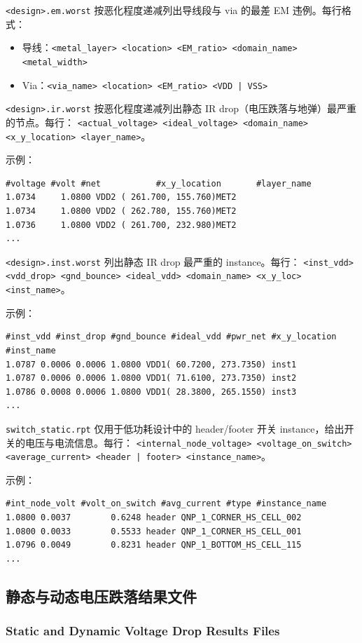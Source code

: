 \texttt{<design>.em.worst} 按恶化程度递减列出导线段与 via 的最差 EM 违例。每行格式：
\begin{itemize}
  \item 导线：\texttt{<metal\_layer> <location> <EM\_ratio> <domain\_name> <metal\_width>}
  \item Via：\texttt{<via\_name> <location> <EM\_ratio> <VDD | VSS>}
\end{itemize}

\texttt{<design>.ir.worst} 按恶化程度递减列出静态 IR drop（电压跌落与地弹）最严重的节点。每行：
\texttt{<actual\_voltage> <ideal\_voltage> <domain\_name> <x\_y\_location> <layer\_name>}。

示例：
\begin{lstlisting}
#voltage #volt #net           #x_y_location       #layer_name
1.0734     1.0800 VDD2 ( 261.700, 155.760)MET2
1.0734     1.0800 VDD2 ( 262.780, 155.760)MET2
1.0736     1.0800 VDD2 ( 261.700, 232.980)MET2
...
\end{lstlisting}

\texttt{<design>.inst.worst} 列出静态 IR drop 最严重的 instance。每行：
\texttt{<inst\_vdd> <vdd\_drop> <gnd\_bounce> <ideal\_vdd> <domain\_name> <x\_y\_loc> <inst\_name>}。

示例：
\begin{lstlisting}
#inst_vdd #inst_drop #gnd_bounce #ideal_vdd #pwr_net #x_y_location #inst_name
1.0787 0.0006 0.0006 1.0800 VDD1( 60.7200, 273.7350) inst1
1.0787 0.0006 0.0006 1.0800 VDD1( 71.6100, 273.7350) inst2
1.0786 0.0008 0.0006 1.0800 VDD1( 28.3800, 265.1550) inst3
...
\end{lstlisting}

\texttt{switch\_static.rpt} 仅用于低功耗设计中的 header/footer 开关 instance，给出开关的电压与电流信息。每行：
\texttt{<internal\_node\_voltage> <voltage\_on\_switch> <average\_current> <header | footer> <instance\_name>}。

示例：
\begin{lstlisting}
#int_node_volt #volt_on_switch #avg_current #type #instance_name
1.0800 0.0037        0.6248 header QNP_1_CORNER_HS_CELL_002
1.0800 0.0033        0.5533 header QNP_1_CORNER_HS_CELL_001
1.0796 0.0049        0.8231 header QNP_1_BOTTOM_HS_CELL_115
...
\end{lstlisting}

\subsection{静态与动态电压跌落结果文件}
\subsubsection*{Static and Dynamic Voltage Drop Results Files}


